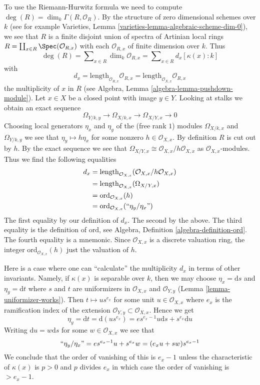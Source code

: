 \medskip\noindent
To use the Riemann-Hurwitz formula we need to compute
$\deg(R) = \dim_k \Gamma(R, \mathcal{O}_R)$. By the structure
of zero dimensional schemes over $k$ (see for example
Varieties, Lemma \ref{varieties-lemma-algebraic-scheme-dim-0}),
we see that $R$ is a finite disjoint union of spectra of
Artinian local rings $R = \coprod_{x \in R} \Spec(\mathcal{O}_{R, x})$
with each $\mathcal{O}_{R, x}$ of finite dimension over $k$. Thus
$$
\deg(R) = \sum\nolimits_{x \in R} \dim_k \mathcal{O}_{R, x} =
\sum\nolimits_{x \in R} d_x [\kappa(x) : k]
$$
with
$$
d_x = \text{length}_{\mathcal{O}_{R, x}} \mathcal{O}_{R, x} =
\text{length}_{\mathcal{O}_{X, x}} \mathcal{O}_{R, x}
$$
the multiplicity of $x$ in $R$
(see Algebra, Lemma \ref{algebra-lemma-pushdown-module}).
Let $x \in X$ be a closed point with image $y \in Y$.
Looking at stalks we obtain an exact sequence
$$
\Omega_{Y/k, y} \to \Omega_{X/k, x} \to \Omega_{X/Y, x} \to 0
$$
Choosing local generators $\eta_x$ and $\eta_y$ of the
(free rank $1$) modules $\Omega_{X/k, x}$ and $\Omega_{Y/k, y}$
we see that
$
\eta_y \mapsto h \eta_x
$
for some nonzero $h \in \mathcal{O}_{X, x}$. By definition
$R$ is cut out by $h$. By the exact sequence we see that
$\Omega_{X/Y, x} \cong \mathcal{O}_{X, x}/h\mathcal{O}_{X, x}$
as $\mathcal{O}_{X, x}$-modules. Thus we find the following
equalities
\begin{align*}
d_x
& =
\text{length}_{\mathcal{O}_{X, x}}(\mathcal{O}_{X, x}/h\mathcal{O}_{X, x}) \\
& =
\text{length}_{\mathcal{O}_{X, x}}(\Omega_{X/Y, x}) \\
& =
\text{ord}_{\mathcal{O}_{X, x}}(h) \\
& =
\text{ord}_{\mathcal{O}_{X, x}}(``\eta_y/\eta_x")
\end{align*}
The first equality by our definition of $d_x$. The second by the above.
The third equality is the definition of $\text{ord}$, see
Algebra, Definition \ref{algebra-definition-ord}.
The fourth equality is a mnemonic.
Since $\mathcal{O}_{X, x}$ is a discrete valuation ring, the
integer $\text{ord}_{\mathcal{O}_{X, x}}(h)$ just the valuation of $h$.

\medskip\noindent
Here is a case where one can ``calculate'' the multiplicity $d_x$ in terms
of other invariants. Namely, if $\kappa(x)$ is separable over $k$, then
we may choose $\eta_x = \text{d}s$ and $\eta_y = \text{d}t$ where $s$
and $t$ are uniformizers in $\mathcal{O}_{X, x}$ and $\mathcal{O}_{Y, y}$
(Lemma \ref{lemma-uniformizer-works}).
Then $t \mapsto u s^{e_x}$ for some unit $u \in \mathcal{O}_{X, x}$
where $e_x$ is the ramification index of the extension
$\mathcal{O}_{Y, y} \subset \mathcal{O}_{X, x}$. Hence we get
$$
\eta_y = \text{d}t = \text{d}(u s^{e_x}) =
e s^{e_x - 1} u \text{d}s + s^{e_x} \text{d}u
$$
Writing $\text{d}u = w \text{d}s$ for some $w \in \mathcal{O}_{X, x}$
we see that
$$
``\eta_y/\eta_x" = e s^{e_x - 1} u + s^{e_x} w = (e_x u + s w)s^{e_x - 1}
$$
We conclude that the order of vanishing of this is $e_x - 1$
unless the characteristic of $\kappa(x)$ is $p > 0$ and $p$ divides $e_x$
in which case the order of vanishing is $> e_x - 1$.

